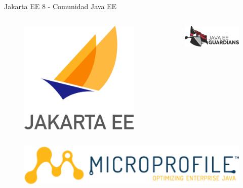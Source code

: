 \documentclass{beamer}
\begin{document}
\begin{frame}{Jakarta EE 8 - Comunidad Java EE}
\begin{columns}
\begin{column}{0.5\textwidth}
	\begin{figure}
		\centering
		\includegraphics[width=0.7\linewidth]{Images/jakartaee}
	\end{figure}
	\end{column}
	\begin{column}{0.5\textwidth}  %
		\begin{figure}
			\centering
			\includegraphics[width=\linewidth]{Images/guardians}
		\end{figure}
	\end{column}
\end{columns}

\begin{figure}
	\centering
	\includegraphics[width=0.7\linewidth]{Images/microprofile-logo}
\end{figure}
\end{frame}
\end{document}
